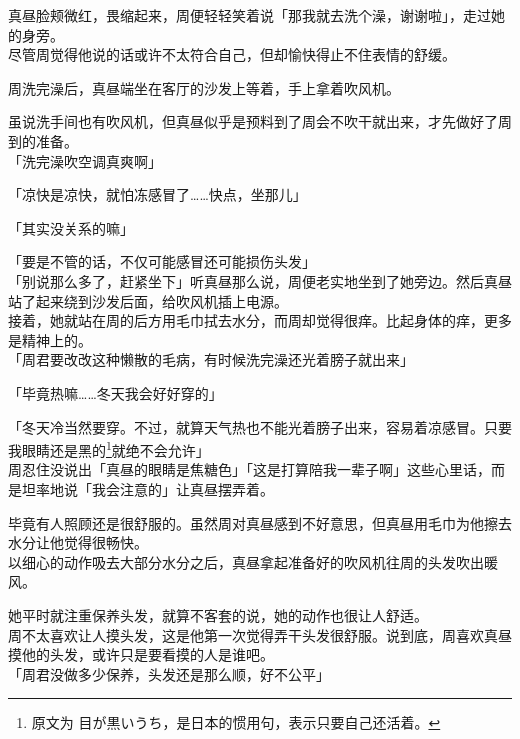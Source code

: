 真昼脸颊微红，畏缩起来，周便轻轻笑着说「那我就去洗个澡，谢谢啦」，走过她的身旁。\\

尽管周觉得他说的话或许不太符合自己，但却愉快得止不住表情的舒缓。\\

\vspace{2\baselineskip}

周洗完澡后，真昼端坐在客厅的沙发上等着，手上拿着吹风机。

虽说洗手间也有吹风机，但真昼似乎是预料到了周会不吹干就出来，才先做好了周到的准备。\\

「洗完澡吹空调真爽啊」

「凉快是凉快，就怕冻感冒了……快点，坐那儿」

「其实没关系的嘛」

「要是不管的话，不仅可能感冒还可能损伤头发」\\

「别说那么多了，赶紧坐下」听真昼那么说，周便老实地坐到了她旁边。然后真昼站了起来绕到沙发后面，给吹风机插上电源。\\

接着，她就站在周的后方用毛巾拭去水分，而周却觉得很痒。比起身体的痒，更多是精神上的。\\

「周君要改改这种懒散的毛病，有时候洗完澡还光着膀子就出来」

「毕竟热嘛……冬天我会好好穿的」

「冬天冷当然要穿。不过，就算天气热也不能光着膀子出来，容易着凉感冒。只要我眼睛还是黑的\footnote{原文为 {\jpfont 目が黒いうち}，是日本的惯用句，表示只要自己还活着。}就绝不会允许」\\

周忍住没说出「真昼的眼睛是焦糖色」「这是打算陪我一辈子啊」这些心里话，而是坦率地说「我会注意的」让真昼摆弄着。

毕竟有人照顾还是很舒服的。虽然周对真昼感到不好意思，但真昼用毛巾为他擦去水分让他觉得很畅快。\\

以细心的动作吸去大部分水分之后，真昼拿起准备好的吹风机往周的头发吹出暖风。

她平时就注重保养头发，就算不客套的说，她的动作也很让人舒适。\\

周不太喜欢让人摸头发，这是他第一次觉得弄干头发很舒服。说到底，周喜欢真昼摸他的头发，或许只是要看摸的人是谁吧。\\

「周君没做多少保养，头发还是那么顺，好不公平」\\

